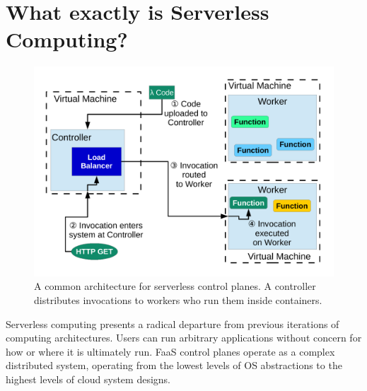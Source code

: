 \section{What exactly is Serverless Computing?}
\label{sec:serverless-computing}

\begin{figure}
  \begin{center}
    \includegraphics[width=.9\columnwidth]{./figures/sys-diag.pdf}
  \caption{A common architecture for serverless control planes. 
          A controller distributes invocations to workers who run them inside containers.}
  \label{fig:serverless-arch}
\end{center}
\end{figure}

Serverless computing presents a radical departure from previous iterations of computing architectures.
Users can run arbitrary applications without concern for how or where it is ultimately run.
FaaS control planes operate as a complex distributed system, operating from the lowest levels of OS abstractions to the highest levels of cloud system designs.

